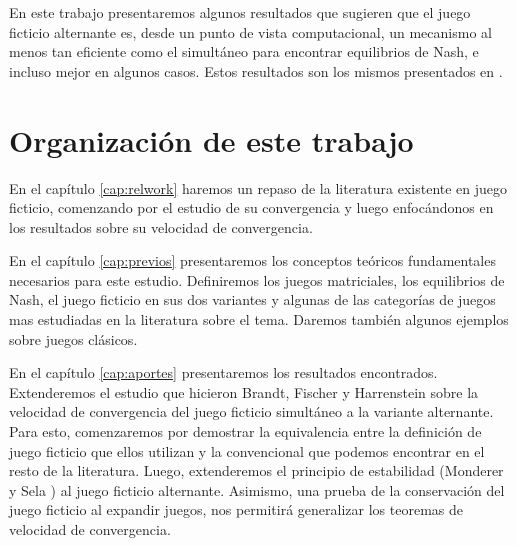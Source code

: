 En este trabajo presentaremos algunos resultados que sugieren que el juego ficticio alternante es, desde un punto de vista computacional, un mecanismo al menos tan eficiente como el simultáneo para encontrar equilibrios de Nash, e incluso mejor en algunos casos. Estos resultados son los mismos presentados en \cite{arbiser:badaloni}.



\section{Organización de este trabajo}

 En el capítulo \ref{cap:relwork} haremos un repaso de la literatura existente en juego ficticio, comenzando por el estudio de su convergencia y luego enfocándonos en los resultados sobre su velocidad de convergencia. 
 
 En el capítulo \ref{cap:previos} presentaremos los conceptos teóricos fundamentales necesarios para este estudio. Definiremos los juegos matriciales, los equilibrios de Nash, el juego ficticio en sus dos variantes y algunas de las categorías de juegos mas estudiadas en la literatura sobre el tema. Daremos también algunos ejemplos sobre juegos clásicos.

 En el capítulo \ref{cap:aportes} presentaremos los resultados encontrados. Extenderemos el estudio que hicieron Brandt, Fischer y Harrenstein \cite{brandt:rate:convergence} sobre la velocidad de convergencia del juego ficticio simultáneo a la variante alternante. Para esto, comenzaremos por demostrar la equivalencia entre la definición de juego ficticio que ellos utilizan y la convencional que podemos encontrar en el resto de la literatura. Luego, extenderemos el principio de estabilidad (Monderer y Sela \cite{no:cycling}) al juego ficticio alternante. Asimismo, una prueba de la conservación del juego ficticio al expandir juegos, nos permitirá generalizar los teoremas de velocidad de convergencia.